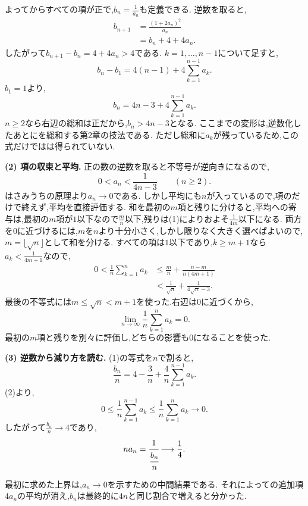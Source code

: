 \begin{enumerate}[label=\textbf{問\arabic*.},leftmargin=3.8em,format=\bookitemlink{practice-entrance}{solution}{problem}]
    よってからすべての項が正で,$b_n=\frac{1}{a_n}$も定義できる.
    逆数を取ると,
    \[
      \begin{aligned}
        b_{n+1}&=\frac{(1+2a_n)^2}{a_n}\\
        &=b_n+4+4a_n.
      \end{aligned}
    \]
    したがって$b_{n+1}-b_n=4+4a_n>4$である.
    $k=1,\ldots,n-1$について足すと,
    \[
      b_n-b_1=4(n-1)+4\sum_{k=1}^{n-1}a_k.
    \]
    $b_1=1$より,
    \[
      b_n=4n-3+4\sum_{k=1}^{n-1}a_k.
    \]
    $n\geq2$なら右辺の総和は正だから,$b_n>4n-3$となる.
    ここまでの変形は,逆数化したあとにを総和する第2章の技法である.
    ただし総和に$a_k$が残っているため,この式だけではは得られていない.
    \par\noindent
    \textbf{(2) 項の収束と平均.}
    正の数の逆数を取ると不等号が逆向きになるので,
    \[
      0<a_n<\frac1{4n-3}\qquad(n\geq2).
    \]
    はさみうちの原理より$a_n\to0$である.
    しかし平均にも$n$が入っているので,項のだけで終えず,平均を直接評価する.
    和を最初の$m$項と残りに分けると,平均への寄与は,最初の$m$項が$1$以下なので$\frac mn$以下,残りは(1)によりおよそ$\frac1{4m}$以下になる.
    両方を0に近づけるには,$m$を$n$より十分小さく,しかし限りなく大きく選べばよいので,$m=\lfloor\sqrt n\rfloor$として和を分ける.
    すべての項は$1$以下であり,$k\ge m+1$なら$a_k<\frac1{4m+1}$なので,
    \[
      \begin{aligned}
        0<\frac1n\sum_{k=1}^{n}a_k
        &\le\frac mn+\frac{n-m}{n(4m+1)}\\
        &<\frac1{\sqrt n}+\frac1{4\sqrt n-3}.
      \end{aligned}
    \]
    最後の不等式には$m\le\sqrt n<m+1$を使った.右辺は0に近づくから,
    \[
      \lim_{n\to\infty}\frac1n\sum_{k=1}^{n}a_k=0.
    \]
    最初の$m$項と残りを別々に評価し,どちらの影響も0になることを使った.
    \par\noindent
    \textbf{(3) 逆数から減り方を読む.}
    (1)の等式を$n$で割ると,
    \[
      \frac{b_n}{n}=4-\frac3n+
      \frac4n\sum_{k=1}^{n-1}a_k.
    \]
    (2)より,
    \[
      0\leq\frac1n\sum_{k=1}^{n-1}a_k
      \leq\frac1n\sum_{k=1}^{n}a_k\longrightarrow0.
    \]
    したがって$\frac{b_n}{n}\to4$であり,
    \[
      na_n=\cfrac{1}{\cfrac{b_n}{n}}\longrightarrow\frac14.
    \]
    \par
    最初に求めた上界は,$a_n\to0$を示すための中間結果である.
    それによっての追加項$4a_n$の平均が消え,$b_n$は最終的に$4n$と同じ割合で増えると分かった.

\end{enumerate}

